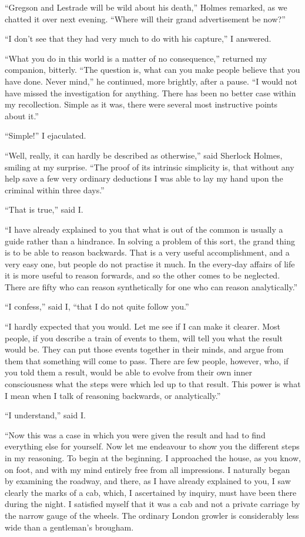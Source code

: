 \documentclass[12pt,english,oneside]{book}
\begin{document}
{}``Gregson and Lestrade will be wild about his death,'' Holmes
remarked, as we chatted it over next evening. {}``Where will their
grand advertisement be now?''

{}``I don't see that they had very much to do with his capture,''
I answered.

{}``What you do in this world is a matter of no consequence,'' returned
my companion, bitterly. {}``The question is, what can you make people
believe that you have done. Never mind,'' he continued, more brightly,
after a pause. {}``I would not have missed the investigation for
anything. There has been no better case within my recollection. Simple
as it was, there were several most instructive points about it.''

{}``Simple!'' I ejaculated.

{}``Well, really, it can hardly be described as otherwise,'' said
Sherlock Holmes, smiling at my surprise. {}``The proof of its intrinsic
simplicity is, that without any help save a few very ordinary deductions
I was able to lay my hand upon the criminal within three days.''

{}``That is true,'' said I.

{}``I have already explained to you that what is out of the common
is usually a guide rather than a hindrance. In solving a problem of
this sort, the grand thing is to be able to reason backwards. That
is a very useful accomplishment, and a very easy one, but people do
not practise it much. In the every-day affairs of life it is more
useful to reason forwards, and so the other comes to be neglected.
There are fifty who can reason synthetically for one who can reason
analytically.''

{}``I confess,'' said I, {}``that I do not quite follow you.''

{}``I hardly expected that you would. Let me see if I can make it
clearer. Most people, if you describe a train of events to them, will
tell you what the result would be. They can put those events together
in their minds, and argue from them that something will come to pass.
There are few people, however, who, if you told them a result, would
be able to evolve from their own inner consciousness what the steps
were which led up to that result. This power is what I mean when I
talk of reasoning backwards, or analytically.''

{}``I understand,'' said I.

{}``Now this was a case in which you were given the result and had
to find everything else for yourself. Now let me endeavour to show
you the different steps in my reasoning. To begin at the beginning.
I approached the house, as you know, on foot, and with my mind entirely
free from all impressions. I naturally began by examining the roadway,
and there, as I have already explained to you, I saw clearly the marks
of a cab, which, I ascertained by inquiry, must have been there during
the night. I satisfied myself that it was a cab and not a private
carriage by the narrow gauge of the wheels. The ordinary London growler
is considerably less wide than a gentleman's brougham.
\end{document}
